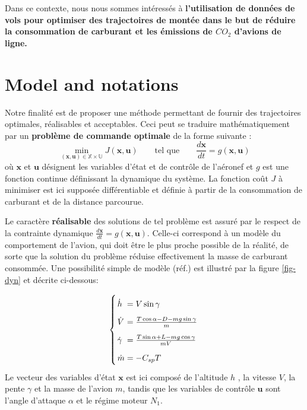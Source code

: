 \documentclass[a0,portrait]{a0poster}
\begin{document}
\begin{multicols}{2}
Dans ce contexte, nous nous sommes intéressés à \textbf{l'utilisation de données de vols pour optimiser des trajectoires de montée dans le but de réduire la consommation de carburant et les émissions de $CO_2$ d'avions de ligne.}


\color{DarkSlateGray} %
\section{Model and notations}

Notre finalité est de proposer une méthode permettant de fournir des trajectoires optimales, réalisables et acceptables. Ceci peut se traduire mathématiquement par un \textbf{problème de commande optimale} de la forme suivante :
\begin{equation}
\min_{(\bm{x,u}) \in \mathbb{X} \times \mathbb{U}} J(\bm{x,u}) 	\qquad     	 \textrm{tel que} \qquad \frac{d \bm{x} }{dt}=g(\bm{x,u})
\end{equation}
où $\bm{x}$ et $\bm{u}$ désignent les variables d'état et de contrôle de l'aéronef et $g$ est une fonction continue définissant la dynamique du système. La fonction coût $J$ à minimiser est ici supposée différentiable et définie à partir de la consommation de carburant et de la distance parcourue.


Le caractère \textbf{réalisable} des solutions de tel problème est assuré par le respect de la contrainte dynamique $\frac{d \bm{x} }{dt}=g(\bm{x,u})$. Celle-ci correspond à un modèle du comportement de l'avion, qui doit être le plus proche possible de la réalité, de sorte que la solution du problème réduise effectivement la masse de carburant consommée. Une possibilité simple de modèle (réf.\cite{hull}) est illustré par la figure \ref{fig-dyn} et décrite ci-dessous:

\begin{align} \label{eq-sys}
\arraycolsep=1.4pt\def\arraystretch{1.8}
\left\{ 
\begin{array}{ll}
\dot{h} &=  V \sin \gamma \\
\dot{V} &=  \frac{T \cos \alpha - D - mg \sin \gamma}{m}\\
\dot{\gamma} &= \frac{T \sin \alpha + L- mg \cos \gamma}{mV}\\
\dot{m} &= -C_{sp} T
\end{array} \right.
\end{align}
Le vecteur des variables d'état $\bm{x}$ est ici composé de l'altitude $h$ , la vitesse $V$, la pente $\gamma$ et la masse de l'avion $m$, tandis que les variables de contrôle $\bm{u}$ sont l'angle d'attaque $\alpha$ et le régime moteur $N_1$.
\newline


\end{multicols}
\end{document}
